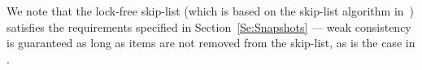 We note that the lock-free skip-list \cite{libcds}
 (which is based on the skip-list algorithm in~\cite{Herlihy2008})
satisfies the requirements specified in Section~\ref{Se:Snapshots} ---
weak consistency is guaranteed as long as items are not
removed from the skip-list, as is the case in \clsm.





